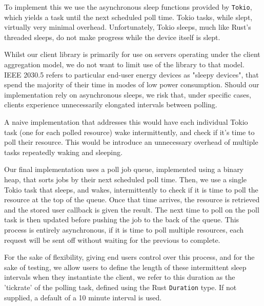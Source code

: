 To implement this we use the asynchronous sleep functions provided by \texttt{Tokio}, which yields a task until the next scheduled poll time. Tokio tasks, while slept, virtually very minimal overhead. Unfortunately, Tokio sleeps, much like Rust's threaded sleeps, do not make progress while the device itself is slept. 

Whilst our client library is primarily for use on servers operating under the client aggregation model, we do not want to limit use of the library to that model. IEEE 2030.5 refers to particular end-user energy devices as "sleepy devices", that spend the majority of their time in modes of low power consumption. Should our implementation rely on asynchronous sleeps, we risk that, under specific cases, clients experience unnecessarily elongated intervals between polling.

A naive implementation that addresses this would have each individual Tokio task (one for each polled resource) wake intermittently, and check if it's time to poll their resource. This would be introduce an unnecessary overhead of multiple tasks repeatedly waking and sleeping.

Our final implementation uses a poll job queue, implemented using a binary heap, that sorts jobs by their next scheduled poll time. Then, we use a single Tokio task that sleeps, and wakes, intermittently to check if it is time to poll the resource at the top of the queue. Once that time arrives, the resource is retrieved and the stored user callback is given the result. The next time to poll on the poll task is then updated before pushing the job to the back of the queue. This process is entirely asynchronous, if it is time to poll multiple resources, each request will be sent off without waiting for the previous to complete. 

For the sake of flexibility, giving end users control over this process, and for the sake of testing, we allow users to define the length of these intermittent sleep intervals when they instantiate the client, we refer to this duration as the 'tickrate' of the polling task, defined using the Rust \texttt{Duration} type. If not supplied, a default of a 10 minute interval is used.

